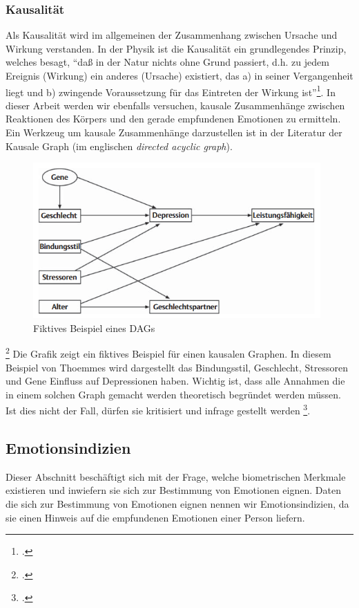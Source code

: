 \subsubsection{Kausalität}
Als Kausalität wird im allgemeinen der Zusammenhang zwischen Ursache und Wirkung verstanden. In der Physik ist die Kausalität ein grundlegendes Prinzip, welches besagt, ``daß in der Natur nichts ohne Grund passiert, d.h. zu jedem Ereignis (Wirkung) ein anderes (Ursache) existiert, das a) in seiner Vergangenheit liegt und b) zwingende Voraussetzung für das Eintreten der Wirkung ist''\footcite{Sav18}.\newline
In dieser Arbeit werden wir ebenfalls versuchen, kausale Zusammenhänge zwischen Reaktionen des Körpers und den gerade empfundenen Emotionen zu ermitteln.
Ein Werkzeug um kausale Zusammenhänge darzustellen ist in der Literatur der Kausale Graph (im englischen \textit{directed acyclic graph}).
\begin{figure}[h]
	\centering
	\includegraphics[width=11cm]{Bilder/dag.png}
	\caption[Fiktives Beispiel eines DAGs]{Fiktives Beispiel eines DAGs\footnotemark}
\end{figure}
\footcite[Vgl.][Kausale Graphen - DAGs]{Tho11}
Die Grafik zeigt ein fiktives Beispiel für einen kausalen Graphen. In diesem Beispiel von Thoemmes wird dargestellt das Bindungsstil, Geschlecht, Stressoren und Gene Einfluss auf Depressionen haben. Wichtig ist, dass alle Annahmen die in einem solchen Graph gemacht werden theoretisch begründet werden müssen. Ist dies nicht der Fall, dürfen sie kritisiert und infrage gestellt werden \footcite[Vgl. ][S.3 Kausale Graphen - DAGs]{Tho11}.
\subsection{Emotionsindizien}
\label{section:Emotionsindizien}
Dieser Abschnitt beschäftigt sich mit der Frage, welche biometrischen Merkmale existieren und inwiefern sie sich zur Bestimmung von Emotionen eignen. Daten die sich zur Bestimmung von Emotionen eignen nennen wir Emotionsindizien, da sie einen Hinweis auf die empfundenen Emotionen einer Person liefern.
